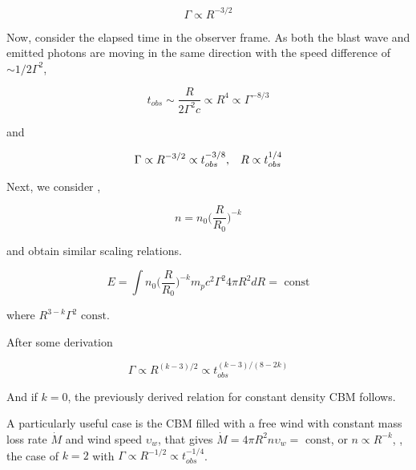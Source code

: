 \begin{equation}
\Gamma \propto R^{-3/2}
\end{equation}

Now, consider the elapsed time in the observer frame. 
As both the blast wave and emitted photons are moving in the same direction with the speed difference of $\sim 1/2 \Gamma^2$, 

\begin{equation}
t_{obs} \sim \frac{R}{2\Gamma^2 c} \propto R^4 \propto \Gamma^{-8/3}
\end{equation}

and 

\begin{equation}
\Gamma \propto R^{-3/2} \propto t_{obs}^{-3/8}, \hspace{3mm} R\propto t_{obs}^{1/4}
\end{equation}


Next, we consider , 

\begin{equation}
n = n_0 \Big(\frac{R}{R_0}\Big)^{-k}
\end{equation}

and obtain similar scaling relations.

\begin{equation}
E = \int n_0 \Big( \frac{R}{R_0} \Big)^{-k} m_p c^2 \Gamma^2  4\pi R^2 dR = \text{ const}
\end{equation}

where $R^{3-k} \Gamma^2 \text{ const}$. 

After some derivation 

\begin{equation}
\Gamma\propto R^{(k-3)/2}\propto t_{obs}^{(k-3)/(8-2k)}
\end{equation}

And if $k=0$, the previously derived relation for constant density CBM follows.

A particularly useful case is the \ac{CBM} filled with a free wind with constant mass loss rate $\dot{M}$ and wind speed $\upsilon_w$, that gives $\dot{M}=4\pi R^2 n \upsilon_w = \text{ const}$, or $n\propto R^{-k}$, \ie, the case of $k=2$ with $\Gamma\propto R^{-1/2}\propto t_{obs}^{-1/4}$.


